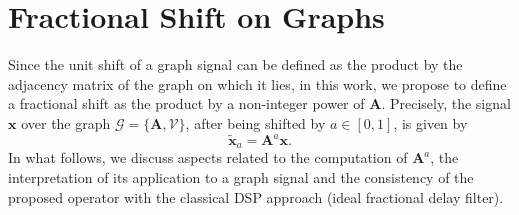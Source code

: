\section{Fractional Shift on Graphs}\label{sec:fracshift}
Since the unit shift of a graph signal can be defined as the product by the adjacency matrix of the graph on which it lies, in this work, we propose to define a fractional shift as the product by a non-integer power of $ \mathbf{A} $. Precisely, the signal $\mathbf{x}$ over the graph $\mathcal{G} = \{ \mathbf{A}, {\mathcal{V}} \}$, after being shifted by $a\in[0,1]$, is given by
\begin{equation}
\label{eq:def_frac_delay}
\widetilde{\mathbf{x}}_a = \mathbf{A}^a \mathbf{x}.
\end{equation}
In what follows, we discuss aspects related to the computation of $\mathbf{A}^a$, the interpretation of its application to a graph signal and the consistency of the proposed operator with the classical DSP approach (ideal fractional delay filter).

